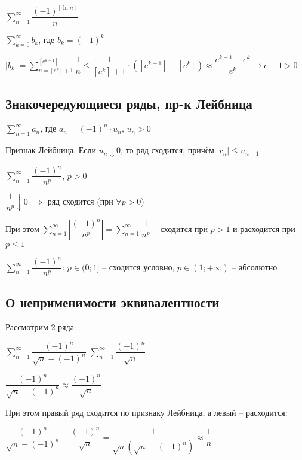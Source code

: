 \begin{example}
    $\sum_{n=1}^{\infty} \dfrac{(-1)^{[\ln n]}}{n}$

    $\sum_{k=0}^{\infty} b_k$, где $b_k = (-1)^k$

    $|b_k| = \sum_{n=[e^k] + 1}^{[e^{k+1}]} \dfrac{1}{n} \leq \dfrac{1}{[e^k] + 1} \cdot ([e^{k+1}]-[e^k]) \approx \dfrac{e^{k+1} - e^k}{e^k} \to e - 1 > 0$
\end{example}

\subsection{Знакочередующиеся ряды, пр-к Лейбница}

$\sum_{n=1}^{\infty} a_n$, где $a_n = (-1)^n \cdot u_n$, $u_n > 0$

\begin{theorem}
Признак Лейбница. Если $u_n \downarrow 0$, то ряд сходится, причём $|r_n| \leq u_{n+1}$
\end{theorem}

\begin{example}
    $\sum_{n=1}^{\infty} \dfrac{(-1)^{n}}{n^p}$, $p > 0$

    $\dfrac{1}{n^p} \downarrow 0 \implies $ ряд сходится (при $\forall p > 0$)
\end{example}

При этом $\sum_{n=1}^{\infty} \left|\dfrac{(-1)^{n}}{n^p}\right| = \sum_{n=1}^{\infty} \dfrac{1}{n^p}$ -- сходится при $p > 1$
и расходится при $p \leq 1$

$\sum_{n=1}^{\infty} \dfrac{(-1)^{n}}{n^p}$: $p \in (0;1]$ -- сходится условно, $p \in (1; +\infty)$ -- абсолютно

\subsection{О неприменимости эквивалентности}

Рассмотрим 2 ряда:

$\sum_{n=1}^{\infty} \dfrac{(-1)^n}{\sqrt{n} - (-1)^n}$ $\sum_{n=1}^{\infty} \dfrac{(-1)^n}{\sqrt{n}}$

$\dfrac{(-1)^n}{\sqrt{n} - (-1)^n} \approx \dfrac{(-1)^n}{\sqrt{n}}$

При этом правый ряд сходится по признаку Лейбница, а левый -- расходится:

$\dfrac{(-1)^n}{\sqrt{n} - (-1)^n} - \dfrac{(-1)^n}{\sqrt{n}} = \dfrac{1}{\sqrt{n}(\sqrt{n} - (-1)^n)} \approx \dfrac{1}{n}$

